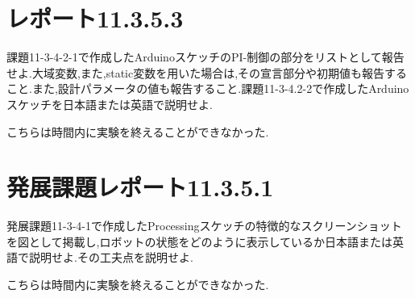 \documentclass{jarticle}
\begin{document}
\section{レポート11.3.5.3}
課題11-3-4-2-1で作成したArduinoスケッチのPI-制御の部分をリストとして報告せよ.大域変数,また,static変数を用いた場合は,その宣言部分や初期値も報告すること.また,設計パラメータの値も報告すること.課題11-3-4.2-2で作成したArduinoスケッチを日本語または英語で説明せよ.

こちらは時間内に実験を終えることができなかった.
\section{発展課題レポート11.3.5.1}
発展課題11-3-4-1で作成したProcessingスケッチの特徴的なスクリーンショットを図として掲載し,ロボットの状態をどのように表示しているか日本語または英語で説明せよ.その工夫点を説明せよ.

こちらは時間内に実験を終えることができなかった.
\end{document}
